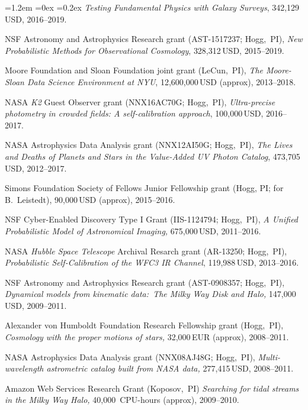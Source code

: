 \documentclass[10pt,letterpaper]{article}
\newcommand{\acronym}[1]{{\small{#1}}}
\newcommand{\project}[1]{\textsl{#1}}
\newcommand{\usd}[1]{{#1}\,\acronym{USD}}
\newcommand{\eur}[1]{{#1}\,\acronym{EUR}}
\newcommand{\grantnumber}[2]{{\footnotesize{#1}}; #2,~\acronym{PI}}
\newcounter{refpubnum}
\newcommand{\hogglist}{%
    \rightmargin=0in
    \leftmargin=1.2em
    \topsep=0ex
    \partopsep=0pt
    \itemsep=0.2ex
    \parsep=0pt
    \itemindent=-1.0\leftmargin
    \listparindent=0.0\leftmargin
    \settowidth{\labelsep}{~}
    \usecounter{refpubnum}
  }
\begin{document}
\begin{list}{}{\hogglist}
  \textit{Testing Fundamental Physics with Galaxy Surveys},
  \usd{342,129}, 2016--2019.
\item
\acronym{NSF} Astronomy and Astrophysics Research grant
(\grantnumber{AST-1517237}{Hogg}),
\textit{New Probabilistic Methods for Observational Cosmology},
\usd{328,312}, 2015--2019.
\item
Moore Foundation and Sloan Foundation joint grant
(LeCun,~\acronym{PI}),
\textit{The Moore-Sloan Data Science Environment at \acronym{NYU}},
\usd{12,600,000} (approx), 2013--2018.
\item
\acronym{NASA} \project{\acronym{K2}} Guest Observer grant
(\grantnumber{NNX16AC70G}{Hogg}),
\textit{Ultra-precise photometry in crowded fields: A self-calibration approach},
\usd{100,000}, 2016--2017.
\item
\acronym{NASA} Astrophysics Data Analysis grant
(\grantnumber{NNX12AI50G}{Hogg}),
\textit{The Lives and Deaths of Planets and Stars in the Value-Added UV Photon Catalog},
\usd{473,705}, 2012--2017.
\item
  Simons Foundation Society of Fellows Junior Fellowship grant (Hogg, PI; for B.~Leistedt),
  \usd{90,000} (approx), 2015--2016.
\item
\acronym{NSF} Cyber-Enabled Discovery Type I Grant
(\grantnumber{IIS-1124794}{Hogg}),
\textit{A Unified Probabilistic Model of Astronomical Imaging,}
\usd{675,000}, 2011--2016.
\item
\acronym{NASA} \project{Hubble Space Telescope} Archival Resarch grant
(\grantnumber{AR-13250}{Hogg}),
\textit{Probabilistic Self-Calibration of the \acronym{WFC3} IR Channel},
\usd{119,988}, 2013--2016.
\item
\acronym{NSF} Astronomy and Astrophysics Research grant
(\grantnumber{AST-0908357}{Hogg}),
\textit{Dynamical models from kinematic data:\ The Milky Way Disk and Halo,}
\usd{147,000}, 2009--2011.
\item
Alexander von Humboldt Foundation Research Fellowship grant
(Hogg,~\acronym{PI}),
\textit{Cosmology with the proper motions of stars,}
\eur{32,000} (approx), 2008--2011.
\item
\acronym{NASA} Astrophysics Data Analysis grant
(\grantnumber{NNX08AJ48G}{Hogg}),
\textit{Multi-wavelength astrometric catalog built from \acronym{NASA} data,}
\usd{277,415}, 2008--2011.
\item
Amazon Web Services Research Grant
(Koposov,~\acronym{PI})
\textit{Searching for tidal streams in the Milky Way Halo,}
40,000~\acronym{CPU}-hours (approx), 2009--2010.
\item

\end{list}
\end{document}
